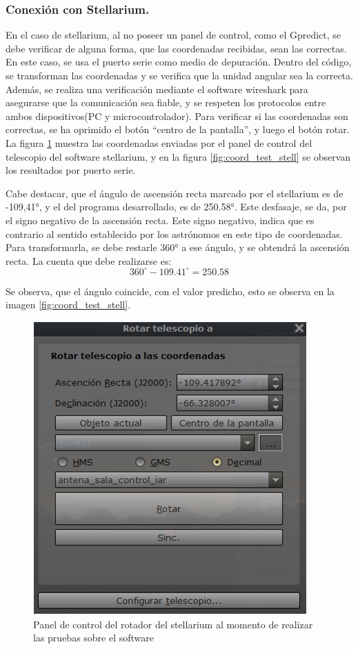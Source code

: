 \subsubsection{Conexión con Stellarium.} 

En el caso de stellarium, al no poseer un panel de control, como el Gpredict, se debe verificar de alguna forma, que las coordenadas recibidas, sean las correctas. En este caso, se usa el puerto serie como medio de depuración. Dentro del código, se transforman las coordenadas y se verifica que la unidad angular sea la correcta. Además, se realiza una verificación mediante el software wireshark para asegurarse que la comunicación sea fiable, y se respeten los protocolos entre ambos dispositivos(PC y microcontrolador).
Para verificar si las coordenadas son correctas, se ha oprimido el botón ``centro de la pantalla'', y luego el botón rotar. La figura \ref{fig:rotador_antena_stell_test} muestra las coordenadas enviadas por el panel de control del telescopio del software stellarium, y en la figura \ref{fig:coord_test_stell} se observan los resultados por puerto serie. 

Cabe destacar, que el ángulo de ascensión recta marcado por el stellarium es de -109,41°, y el del programa desarrollado, es de 250.58°. Este desfasaje, se da, por el signo negativo de la ascensión recta. Este signo negativo, indica que es contrario al sentido establecido por los astrónomos en este tipo de coordenadas. Para transformarla, se debe restarle 360° a ese ángulo, y se obtendrá la ascensión recta. La cuenta que debe realizarse es: 
\begin{equation*}
	360^\circ - 109.41^\circ = 250.58 
\end{equation*}

 Se observa, que el ángulo coincide, con el valor predicho, esto se observa en la imagen \ref{fig:coord_test_stell}.  
\begin{figure}[ht!]
	\includegraphics{rotador_antena_stell} 
	\caption{Panel de control del rotador del stellarium al momento de realizar las pruebas sobre el software} 
	\label{fig:rotador_antena_stell_test}
\end{figure}

